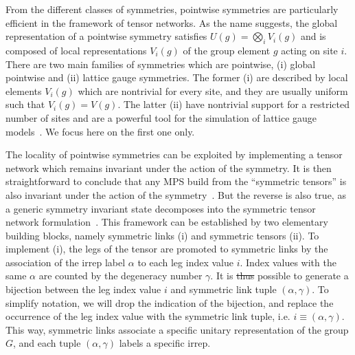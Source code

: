 \documentclass{svmono}
\providecommand{\DIFdeltex}[1]{{\protect\color{red}\sout{#1}}}                      %
\providecommand{\DIFdelbegin}{} %
\providecommand{\DIFdelend}{} %
\providecommand{\DIFdel}[1]{\texorpdfstring{\DIFdeltex{#1}}{}} %
\newcommand{\DIFscaledelfig}{0.5}
\newlength{\DIFdelgraphicswidth} %
\newlength{\DIFdelgraphicsheight} %
\newcommand{\DIFdelincludegraphics}[2][]{%
\sbox{\DIFdelgraphicsbox}{\DIFOincludegraphics[#1]{#2}}%
\settoboxwidth{\DIFdelgraphicswidth}{\DIFdelgraphicsbox} %
\settoboxtotalheight{\DIFdelgraphicsheight}{\DIFdelgraphicsbox} %
\scalebox{\DIFscaledelfig}{%
\parbox[b]{\DIFdelgraphicswidth}{\usebox{\DIFdelgraphicsbox}\\[-\baselineskip] \rule{\DIFdelgraphicswidth}{0em}}\llap{\resizebox{\DIFdelgraphicswidth}{\DIFdelgraphicsheight}{%
\setlength{\unitlength}{\DIFdelgraphicswidth}%
\begin{picture}(1,1)%
\thicklines\linethickness{2pt} %
{\color[rgb]{1,0,0}\put(0,0){\framebox(1,1){}}}%
{\color[rgb]{1,0,0}\put(0,0){\line( 1,1){1}}}%
{\color[rgb]{1,0,0}\put(0,1){\line(1,-1){1}}}%
\end{picture}%
}\hspace*{3pt}}} %
} %
\DeclareRobustCommand{\DIFdelbegin}{\DIFOdelbegin \let\includegraphics\DIFdelincludegraphics} %
\DeclareRobustCommand{\DIFdelend}{\DIFOaddend \let\includegraphics\DIFOincludegraphics} %
\begin{document}
From the different classes of symmetries, pointwise symmetries are particularly efficient in the framework of tensor networks.
As the name suggests, the global representation of a pointwise symmetry satisfies $U(g)=\bigotimes_i V_i(g)$ and is composed of local representations $V_i(g)$ of the group element $g$ acting on site $i$.
There are two main families of symmetries which are pointwise, (i) global pointwise and (ii) lattice gauge symmetries.
The former (i) are described by local elements $V_i(g)$ which are nontrivial for every site, and they are usually uniform such that $V_i(g)=V(g)$.
The latter (ii) have nontrivial support for a restricted number of sites and are a powerful tool for the simulation of lattice gauge models~\cite{Banuls2014,Buyens2015}.
We focus here on the first one only.

The locality of pointwise symmetries can be exploited by implementing a tensor network which remains invariant under the action of the symmetry.
It is then straightforward to conclude that any MPS build from the ``symmetric tensors'' is also invariant under the action of the symmetry~\cite{Singh2010}.
But the reverse is also true, as a generic symmetry invariant state decomposes into the symmetric tensor network formulation~\cite{Singh2013}.
This framework can be established by two elementary building blocks, namely symmetric links (i) and symmetric tensors (ii).
To implement (i), the legs of the tensor are promoted to symmetric links by the association of the irrep label $\alpha$ to each leg index value $i$.
Index values with the same $\alpha$ are counted by the degeneracy number $\gamma$.
It is \DIFdelbegin \DIFdel{thus }\DIFdelend possible to generate a bijection between the leg index value $i$ and symmetric link tuple $(\alpha,\gamma)$.
To simplify notation, we will drop the indication of the bijection, and replace the occurrence of the leg index value with the symmetric link tuple, i.e. $i\equiv(\alpha,\gamma)$.
This way, symmetric links associate a specific unitary representation of the group $G$, and each tuple $(\alpha,\gamma)$ labels a specific irrep.
\end{document}
